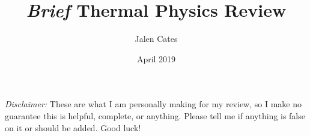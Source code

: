 \documentclass{article}
\title{\emph{Brief} Thermal Physics Review}
\author{Jalen Cates}
\date{April 2019}
\begin{document}
\maketitle

\emph{Disclaimer:} These are what I am personally making for my review, so I make no guarantee this is helpful, complete, or anything. Please tell me if anything is false on it or should be added. Good luck!












\end{document}
